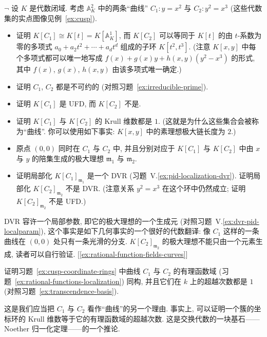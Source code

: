 \begin{prob}\label{ex:cusp-coordinate-rings}
$\neg$ 设 $K$ 是代数闭域. 考虑 $\mathbb{A}_K^2$ 中的两条``曲线'' $C_1:y=x^2$ 与 $C_2:y^2=x^3$ (这些代数集的实点图像见例~\ref{ex:cusp}).
\begin{itemize}
\item 证明 $K[C_1]\cong K[t]=K[\mathbb{A}_K^1]$, 而 $K[C_2]$ 可以等同于 $K[t]$ 的由 $t$-系数为零的多项式 $a_0+a_2t^2+\cdots +a_dt^d$ 组成的子环 $K[t^2,t^3]$. (注意 $K[x,y]$ 中每个多项式都可以唯一地写成 $f(x)+g(x)y+h(x,y)(y^2-x^3)$ 的形式, 其中 $f(x)$, $g(x)$, $h(x,y)$ 由该多项式唯一确定.)
\item 证明 $C_1$, $C_2$ 都是不可约的 (对照习题~\ref{ex:irreducible-prime}).
\item 证明 $K[C_1]$ 是 UFD, 而 $K[C_2]$ 不是.
\item 证明 $K[C_1]$ 与 $K[C_2]$ 的 Krull 维数都是 $1$. (这就是为什么这些集合会被称为``曲线''. 你可以使用如下事实: $K[x,y]$ 中的素理想极大链长度为 $2$.)
\item 原点 $(0,0)$ 同时在 $C_1$ 与 $C_2$ 中, 并且分别对应于 $K[C_1]$ 与 $K[C_2]$ 中由 $x$ 与 $y$ 的陪集生成的极大理想 $\mathfrak{m}_1$ 与 $\mathfrak{m}_2$.
\item 证明局部化 $K[C_1]_{\mathfrak{m}_1}$ 是一个 DVR (习题~V.\ref{ex:pid-localization-dvr}). 证明局部化 $K[C_2]_{\mathfrak{m}_2}$ 不是 DVR. (注意关系 $y^2=x^3$ 在这个环中仍然成立; 证明 $K[C_2]_{\mathfrak{m}_2}$ 不是 UFD.)
\end{itemize}
DVR 容许一个局部参数, 即它的极大理想的一个生成元 (对照习题~V.\ref{ex:dvr-pid-localparam}), 这个事实是如下几何事实的一个很好的代数翻译: 像 $C_1$ 这样的一条曲线在 $(0,0)$ 处只有一条光滑的分支. $K[C_2]_{\mathfrak{m}_2}$ 的极大理想不能只由一个元素生成, 读者可以自行验证. [\ref{ex:rational-function-fields-curves}]
\end{prob}

\begin{prob}\label{ex:rational-function-fields-curves}
证明习题~\ref{ex:cusp-coordinate-rings} 中曲线 $C_1$ 与 $C_2$ 的有理函数域 (习题~\ref{ex:rational-functions-localization}) 同构, 并且它们在 $k$ 上的超越次数都是 $1$ (对照习题~\ref{ex:transcendence-basis}).

这是我们应当把 $C_1$ 与 $C_2$ 看作``曲线''的另一个理由. 事实上, 可以证明一个簇的坐标环的 Krull 维数等于它的有理函数域的超越次数. 这是交换代数的一块基石——Noether 归一化定理——的一个推论.
\end{prob}

